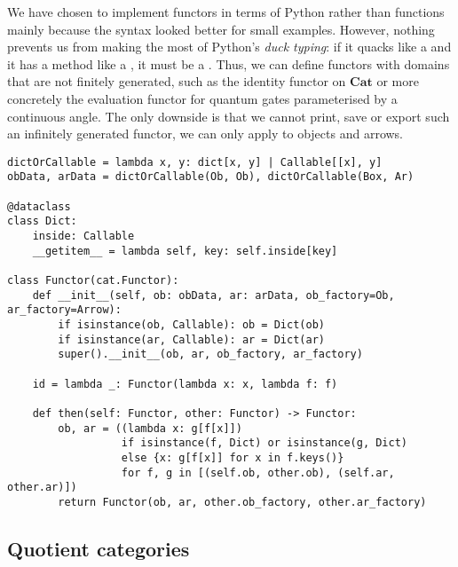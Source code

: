 \begin{remark}
We have chosen to implement functors in terms of Python  rather than functions mainly because the syntax looked better for small examples.
However, nothing prevents us from making the most of Python's \emph{duck typing}: if it quacks like a  and it has a  method like a , it must be a .
Thus, we can define functors with domains that are not finitely generated, such as the identity functor on $\mathbf{Cat}$ or more concretely the evaluation functor for quantum gates parameterised by a continuous angle.
The only downside is that we cannot print, save or export such an infinitely generated functor, we can only apply to objects and arrows.

\begin{verbatim}
dictOrCallable = lambda x, y: dict[x, y] | Callable[[x], y]
obData, arData = dictOrCallable(Ob, Ob), dictOrCallable(Box, Ar)

@dataclass
class Dict:
    inside: Callable
    __getitem__ = lambda self, key: self.inside[key]

class Functor(cat.Functor):
    def __init__(self, ob: obData, ar: arData, ob_factory=Ob, ar_factory=Arrow):
        if isinstance(ob, Callable): ob = Dict(ob)
        if isinstance(ar, Callable): ar = Dict(ar)
        super().__init__(ob, ar, ob_factory, ar_factory)

    id = lambda _: Functor(lambda x: x, lambda f: f)

    def then(self: Functor, other: Functor) -> Functor:
        ob, ar = ((lambda x: g[f[x]])
                  if isinstance(f, Dict) or isinstance(g, Dict)
                  else {x: g[f[x]] for x in f.keys()}
                  for f, g in [(self.ob, other.ob), (self.ar, other.ar)])
        return Functor(ob, ar, other.ob_factory, other.ar_factory)
\end{verbatim}
\end{remark}

\subsection{Quotient categories}

